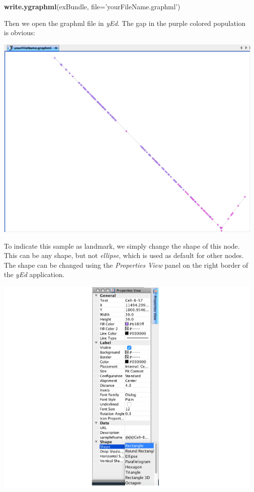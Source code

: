 \documentclass[]{book}
\newenvironment{Shaded}{\begin{snugshade}}{\end{snugshade}}
\newcommand{\KeywordTok}[1]{\textcolor[rgb]{0.13,0.29,0.53}{\textbf{#1}}}
\newcommand{\DataTypeTok}[1]{\textcolor[rgb]{0.13,0.29,0.53}{#1}}
\newcommand{\StringTok}[1]{\textcolor[rgb]{0.31,0.60,0.02}{#1}}
\newcommand{\NormalTok}[1]{#1}
\theoremstyle{definition}
\theoremstyle{definition}
\theoremstyle{definition}
\theoremstyle{remark}
\begin{document}
\begin{Shaded}
\begin{Highlighting}[]
\KeywordTok{write.ygraphml}\NormalTok{(exBundle, }\DataTypeTok{file=}\StringTok{'yourFileName.graphml'}\NormalTok{)}
\end{Highlighting}
\end{Shaded}

Then we open the graphml file in \emph{yEd}. The gap in the purple
colored population is obvious:

\includegraphics[width=23.17in]{img/yEd_7}

To indicate this sample as landmark, we simply change the shape of this
node. This can be any shape, but not \emph{ellipse}, which is used as
default for other nodes. The shape can be changed using the
\emph{Properties View} panel on the right border of the \emph{yEd}
application.

\includegraphics[width=23.17in]{img/yEd_8}
\end{document}
